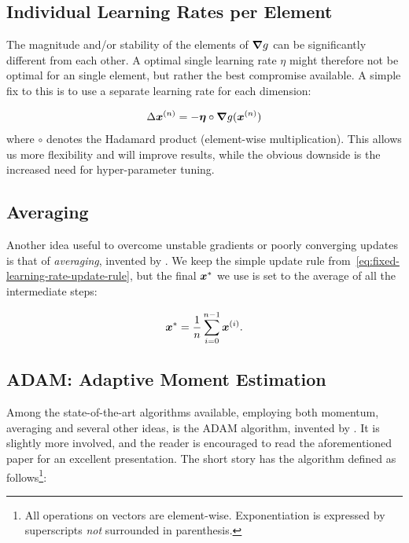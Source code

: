 \documentclass[Thesis.tex]{subfiles}
\begin{document}
\subsection{Individual Learning Rates per Element}

The magnitude and/or stability of the elements of $\grad{g}$ can be
significantly different from each other. A optimal single learning rate $\eta$ might
therefore not be optimal for an single element, but rather the best compromise
available. A simple fix to this is to use a separate learning rate for each
dimension:

\begin{align}
  \Delta\bm{x}^{(n)} = -\bm{\eta}\circ\grad{g}(\bm{x}^{(n)})
\end{align}
where $\circ$ denotes the Hadamard product (element-wise multiplication). This
allows us more flexibility and will improve results, while the obvious downside
is the increased need for hyper-parameter tuning.


\subsection{Averaging}

Another idea useful to overcome unstable gradients or poorly converging updates
is that of \emph{averaging}, invented by \textcite{Polyak-1992}. We keep the
simple update rule from~\cref{eq:fixed-learning-rate-update-rule}, but the final
$\bm{x}^*$ we use is set to the average of all the intermediate steps:

\begin{align}
  \label{eq:averaging-update-rule-def}
  \bm{x}^* = \frac{1}{n}\sum_{i=0}^{n-1} \bm{x}^{(i)}.
\end{align}

\subsection{ADAM: Adaptive Moment Estimation}

Among the state-of-the-art algorithms available, employing both momentum,
averaging and several other ideas, is the ADAM algorithm, invented by
\textcite{KingmaB14}. It is slightly more involved, and the reader is encouraged
to read the aforementioned paper for an excellent presentation. The short story
has the algorithm defined as follows\footnote{All operations on vectors are
  element-wise. Exponentiation is expressed by superscripts \emph{not}
  surrounded in parenthesis.}:
\end{document}
